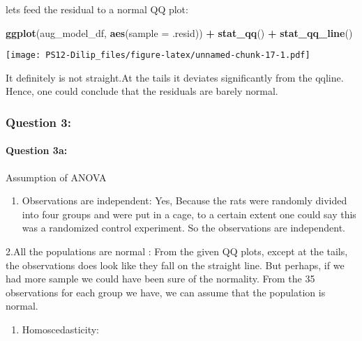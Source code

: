 \documentclass[
]{article}
\newenvironment{Shaded}{\begin{snugshade}}{\end{snugshade}}
\newcommand{\AttributeTok}[1]{\textcolor[rgb]{0.13,0.29,0.53}{#1}}
\newcommand{\FunctionTok}[1]{\textcolor[rgb]{0.13,0.29,0.53}{\textbf{#1}}}
\newcommand{\NormalTok}[1]{#1}
\newcommand{\SpecialCharTok}[1]{\textcolor[rgb]{0.81,0.36,0.00}{\textbf{#1}}}
\providecommand{\tightlist}{%
  \setlength{\itemsep}{0pt}\setlength{\parskip}{0pt}}
\begin{document}
lets feed the residual to a normal QQ plot:

\begin{Shaded}
\begin{Highlighting}[]
\FunctionTok{ggplot}\NormalTok{(aug\_model\_df, }\FunctionTok{aes}\NormalTok{(}\AttributeTok{sample =}\NormalTok{ .resid)) }\SpecialCharTok{+} \FunctionTok{stat\_qq}\NormalTok{() }\SpecialCharTok{+} \FunctionTok{stat\_qq\_line}\NormalTok{()}
\end{Highlighting}
\end{Shaded}

\texttt{[image: PS12-Dilip\_files/figure-latex/unnamed-chunk-17-1.pdf]}

It definitely is not straight.At the tails it deviates significantly
from the qqline. Hence, one could conclude that the residuals are barely
normal.

\hypertarget{question-3}{%
\subsubsection{Question 3:}\label{question-3}}

\hypertarget{question-3a}{%
\paragraph{Question 3a:}\label{question-3a}}

Assumption of ANOVA

\begin{enumerate}
\def\labelenumi{\arabic{enumi}.}
\tightlist
\item
  Observations are independent: Yes, Because the rats were randomly
  divided into four groups and were put in a cage, to a certain extent
  one could say this was a randomized control experiment. So the
  observations are independent.
\end{enumerate}

2.All the populations are normal : From the given QQ plots, except at
the tails, the observations does look like they fall on the straight
line. But perhaps, if we had more sample we could have been sure of the
normality. From the 35 observations for each group we have, we can
assume that the population is normal.

\begin{enumerate}
\def\labelenumi{\arabic{enumi}.}
\setcounter{enumi}{2}
\tightlist
\item
  Homoscedasticity:
\end{enumerate}
\end{document}
